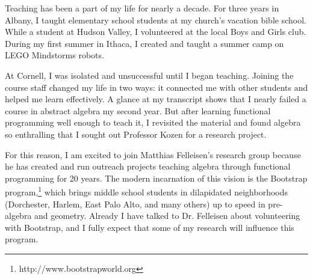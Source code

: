 \documentclass[12pt]{article}
\newcommand{\hdr}[2]{\vspace{-0.4cm}{\flushleft{\hrulefill\\\textbf{#1}\hfill{#2}\\\vspace{-0.2cm}\hrulefill}}\vspace{0.1cm}}
\begin{document}
\hdr{Broader Impacts}{}

Teaching has been a part of my life for nearly a decade.
For three years in Albany, I taught elementary school students at my church's vacation bible school.
While a student at Hudson Valley, I volunteered at the local Boys and Girls club.
During my first summer in Ithaca, I created and taught a summer camp on LEGO Mindstorms robots.

At Cornell, I was isolated and unsuccessful until I began teaching.
Joining the course staff changed my life in two ways: it connected me with other students and helped me learn effectively.
A glance at my transcript shows that I nearly failed a course in abstract algebra my second year.
But after learning functional programming well enough to teach it, I revisited the material and found algebra so enthralling that I sought out Professor Kozen for a research project.

For this reason, I am excited to join Matthias Felleisen's research group because he has created and run outreach projects teaching algebra through functional programming for 20 years.
The modern incarnation of this vision is the Bootstrap program,\footnote{http://www.bootstrapworld.org} which brings middle school students in dilapidated neighborhoods (Dorchester, Harlem, East Palo Alto, and many others) up to speed in pre-algebra and geometry.
Already I have talked to Dr. Felleisen about volunteering with Bootstrap, and I fully expect that some of my research will influence this program.

\vfill
\renewcommand{\section}[2]{}
\begin{multicols}{2}
\footnotesize


\end{multicols}
\end{document}
